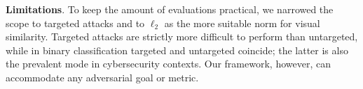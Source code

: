 

\textbf{Limitations}.
To keep the amount of evaluations practical, we narrowed the scope to targeted attacks and to $\ell_2$ as the more suitable norm for visual similarity.
Targeted attacks are strictly more difficult to perform than untargeted, while in binary classification targeted and untargeted coincide; the latter is also the prevalent mode in cybersecurity contexts.
Our framework, however, can accommodate any adversarial goal or metric.

